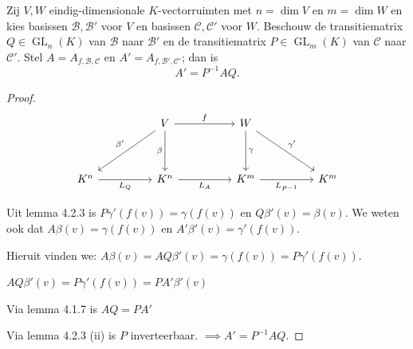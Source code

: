 \begin{stelling}[4.2.5]
    Zij $V, W$ eindig-dimensionale $K$-vectorruimten met $n = \dim V$ en $m = \dim W$ en kies basissen $\mathcal{B}, \mathcal{B}'$ voor $V$ en basissen $\mathcal{C}, \mathcal{C}'$ voor $W$. Beschouw de transitiematrix $Q \in \operatorname{GL}_n(K)$ van $\mathcal{B}$ naar $\mathcal{B}'$ en de transitiematrix $P \in \operatorname{GL}_m(K)$ van $\mathcal{C}$ naar $\mathcal{C}'$. Stel $A = A_{f,\mathcal{B},\mathcal{C}}$ en $A' = A_{f,\mathcal{B}',\mathcal{C}'}$; dan is
    \[ A' = P^{-1}AQ. \]
\end{stelling}
\begin{proof}
    \begin{equation*}
    \begin{tikzcd}[row sep=huge, column sep=huge]
        & V \arrow[r, "f"] \arrow[dl, "\beta'"'] \arrow[d, "\beta"'] & W \arrow[d, "\gamma"] \arrow[dr, "\gamma'"] & \\
        K^n \arrow[r, "L_Q"'] & K^n  \arrow[r, "L_A"']  &  K^m \arrow[r, "L_{P^{-1}}"'] & K^m
    \end{tikzcd}
    \end{equation*}

    Uit lemma 4.2.3 is \(P \gamma'(f(v)) = \gamma(f(v))\) en \(Q \beta'(v) = \beta(v) \).
    We weten ook dat \(A \beta (v) = \gamma (f(v))\) en \(A' \beta'(v) = \gamma' (f(v))\).

    Hieruit vinden we: \(A \beta (v)= A Q \beta'(v)  = \gamma (f(v)) = P \gamma'(f(v))\).

    \(A Q \beta'(v) = P \gamma'(f(v)) = PA' \beta'(v)\)

    Via lemma 4.1.7 is \(AQ = PA'\) 

    Via lemma 4.2.3 (ii) is \( P\) inverteerbaar.
    \(\implies A' = P^{-1}AQ\).

\end{proof}

